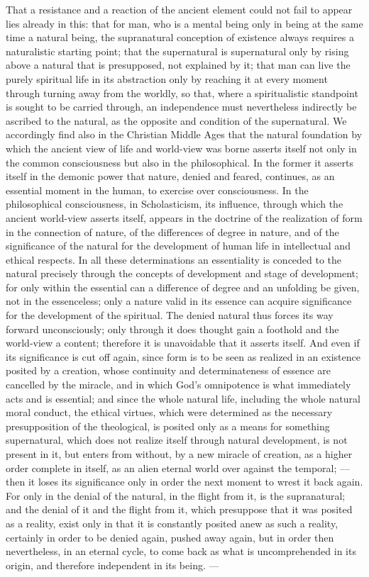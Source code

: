 That a resistance and a reaction of the ancient element could not fail to appear lies already in this: that for man, who is a mental being only in being at the same time a natural being, the supranatural conception of existence always requires a naturalistic starting point; that the supernatural is supernatural only by rising above a natural that is presupposed, not explained by it; that man can live the purely spiritual life in its abstraction only by reaching it at every moment through turning away from the worldly, so that, where a spiritualistic standpoint is sought to be carried through, an independence must nevertheless indirectly be ascribed to the natural, as the opposite and condition of the supernatural. We accordingly find also in the Christian Middle Ages that the natural foundation by which the ancient view of life and world-view was borne asserts itself not only in the common consciousness but also in the philosophical. In the former it asserts itself in the demonic power that nature, denied and feared, continues, as an essential moment in the human, to exercise over consciousness. In the philosophical consciousness, in Scholasticism, its influence, through which the ancient world-view asserts itself, appears in the doctrine of the realization of form in the connection of nature, of the differences of degree in nature, and of the significance of the natural for the development of human life in intellectual and ethical respects. In all these determinations an essentiality is conceded to the natural precisely through the concepts of development and stage of development; for only within the essential can a difference of degree and an unfolding be given, not in the essenceless; only a nature valid in its essence can acquire significance for the development of the spiritual. The denied natural thus forces its way forward unconsciously; only through it does thought gain a foothold and the world-view a content; therefore it is unavoidable that it asserts itself. And even if its significance is cut off again, since form is to be seen as realized in an existence posited by a creation, whose continuity and determinateness of essence are cancelled by the miracle, and in which God's omnipotence is what immediately acts and is essential; and since the whole natural life, including the whole natural moral conduct, the ethical virtues, which were determined as the necessary presupposition of the theological, is posited only as a means for something supernatural, which does not realize itself through natural development, is not present in it, but enters from without, by a new miracle of creation, as a higher order complete in itself, as an alien eternal world over against the temporal; --- then it loses its significance only in order the next moment to wrest it back again. For only in the denial of the natural, in the flight from it, is the supranatural; and the denial of it and the flight from it, which presuppose that it was posited as a reality, exist only in that it is constantly posited anew as such a reality, certainly in order to be denied again, pushed away again, but in order then nevertheless, in an eternal cycle, to come back as what is uncomprehended in its origin, and therefore independent in its being. ---

